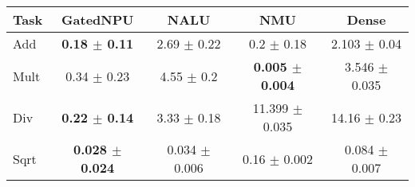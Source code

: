 \begin{tabular}{lcccc}
\toprule
Task & GatedNPU & NALU & NMU & Dense\\
\midrule
Add  & \textbf{0.18 $\pm$ 0.11} & 2.69 $\pm$ 0.22 & 0.2 $\pm$ 0.18 & 2.103 $\pm$ 0.04 \\
Mult & 0.34 $\pm$ 0.23 & 4.55 $\pm$ 0.2 & \textbf{0.005 $\pm$ 0.004} & 3.546 $\pm$ 0.035 \\
Div  & \textbf{0.22 $\pm$ 0.14} & 3.33 $\pm$ 0.18 & 11.399 $\pm$ 0.035 & 14.16 $\pm$ 0.23 \\
Sqrt & \textbf{0.028 $\pm$ 0.024} & 0.034 $\pm$ 0.006 & 0.16 $\pm$ 0.002 & 0.084 $\pm$ 0.007 \\
\bottomrule
\end{tabular}
